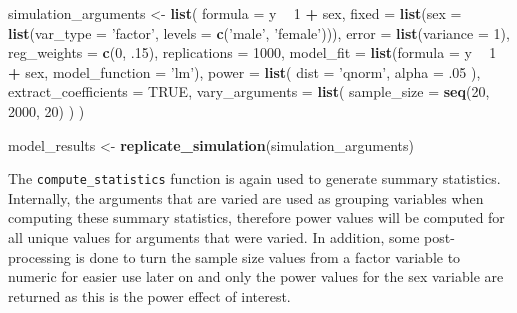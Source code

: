 \documentclass[man,mask,floatsintext]{apa6}
\newenvironment{Shaded}{\begin{snugshade}}{\end{snugshade}}
\newcommand{\DataTypeTok}[1]{\textcolor[rgb]{0.13,0.29,0.53}{#1}}
\newcommand{\DecValTok}[1]{\textcolor[rgb]{0.00,0.00,0.81}{#1}}
\newcommand{\FloatTok}[1]{\textcolor[rgb]{0.00,0.00,0.81}{#1}}
\newcommand{\KeywordTok}[1]{\textcolor[rgb]{0.13,0.29,0.53}{\textbf{#1}}}
\newcommand{\NormalTok}[1]{#1}
\newcommand{\OperatorTok}[1]{\textcolor[rgb]{0.81,0.36,0.00}{\textbf{#1}}}
\newcommand{\OtherTok}[1]{\textcolor[rgb]{0.56,0.35,0.01}{#1}}
\newcommand{\StringTok}[1]{\textcolor[rgb]{0.31,0.60,0.02}{#1}}
\begin{document}
\begin{Shaded}
\begin{Highlighting}[]
\NormalTok{simulation_arguments <-}\StringTok{ }\KeywordTok{list}\NormalTok{(}
  \DataTypeTok{formula =}\NormalTok{ y }\OperatorTok{~}\StringTok{ }\DecValTok{1} \OperatorTok{+}\StringTok{ }\NormalTok{sex, }
  \DataTypeTok{fixed =} \KeywordTok{list}\NormalTok{(}\DataTypeTok{sex =} \KeywordTok{list}\NormalTok{(}\DataTypeTok{var_type =} \StringTok{'factor'}\NormalTok{, }
                            \DataTypeTok{levels =} \KeywordTok{c}\NormalTok{(}\StringTok{'male'}\NormalTok{, }\StringTok{'female'}\NormalTok{))),}
  \DataTypeTok{error =} \KeywordTok{list}\NormalTok{(}\DataTypeTok{variance =} \DecValTok{1}\NormalTok{),}
  \DataTypeTok{reg_weights =} \KeywordTok{c}\NormalTok{(}\DecValTok{0}\NormalTok{, }\FloatTok{.15}\NormalTok{),}
  \DataTypeTok{replications =} \DecValTok{1000}\NormalTok{,}
  \DataTypeTok{model_fit =} \KeywordTok{list}\NormalTok{(}\DataTypeTok{formula =}\NormalTok{ y }\OperatorTok{~}\StringTok{ }\DecValTok{1} \OperatorTok{+}\StringTok{ }\NormalTok{sex,}
                   \DataTypeTok{model_function =} \StringTok{'lm'}\NormalTok{),}
  \DataTypeTok{power =} \KeywordTok{list}\NormalTok{(}
    \DataTypeTok{dist =} \StringTok{'qnorm'}\NormalTok{,}
    \DataTypeTok{alpha =} \FloatTok{.05}
\NormalTok{  ),}
  \DataTypeTok{extract_coefficients =} \OtherTok{TRUE}\NormalTok{,}
  \DataTypeTok{vary_arguments =} \KeywordTok{list}\NormalTok{(}
    \DataTypeTok{sample_size =} \KeywordTok{seq}\NormalTok{(}\DecValTok{20}\NormalTok{, }\DecValTok{2000}\NormalTok{, }\DecValTok{20}\NormalTok{) }
\NormalTok{  )}
\NormalTok{)}

\NormalTok{model_results <-}\StringTok{ }\KeywordTok{replicate_simulation}\NormalTok{(simulation_arguments) }
\end{Highlighting}
\end{Shaded}

The \texttt{compute\_statistics} function is again used to generate summary statistics. Internally, the arguments that are varied are used as grouping variables when computing these summary statistics, therefore power values will be computed for all unique values for arguments that were varied. In addition, some post-processing is done to turn the sample size values from a factor variable to numeric for easier use later on and only the power values for the sex variable are returned as this is the power effect of interest.
\end{document}
